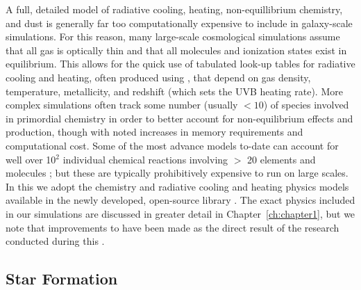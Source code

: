 A full, detailed model of radiative cooling, heating, non-equillibrium chemistry, and dust is generally far too computationally expensive to include in galaxy-scale simulations. For this reason, many large-scale cosmological simulations assume that all gas is optically thin and that all molecules and ionization states exist in equilibrium. This allows for the quick use of tabulated look-up tables for radiative cooling and heating, often produced using  \citep{Cloudy2013}, that depend on gas density, temperature, metallicity, and redshift (which sets the UVB heating rate). More complex simulations often track some number (usually $< 10$) of species involved in primordial chemistry in order to better account for non-equilibrium effects and \Hmolecular production, though with noted increases in memory requirements and computational cost. Some of the most advance models to-date can account for well over 10$^2$ individual chemical reactions involving $>$ 20 elements and molecules \citep[e.g.][]{Richings2015,Richings2018}; but these are typically prohibitively expensive to run on large scales. In this \dissertation we adopt the chemistry and radiative cooling and heating physics models available in the newly developed, open-source library  \citep{GrackleMethod}. The exact physics included in our simulations are discussed in greater detail in Chapter~\ref{ch:chapter1}, but we note that improvements to  have been made as the direct result of the research conducted during this \dissertation.

\subsection{Star Formation} \label{intro:sec:sf}

